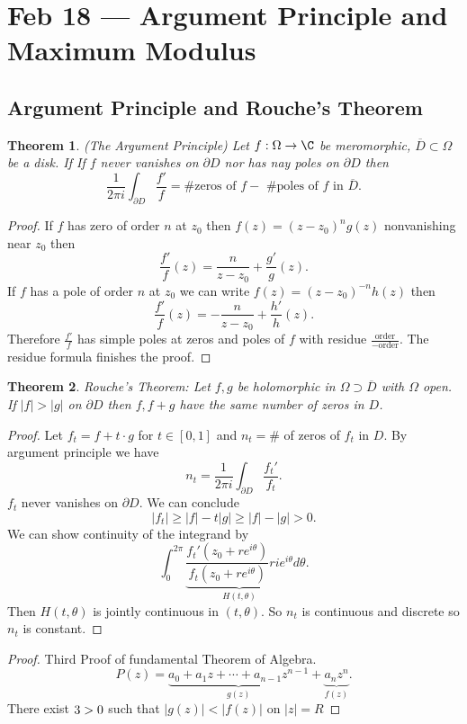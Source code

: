 \documentclass[a4paper]{article}
\newtheorem{thm}{Theorem}[section]
\begin{document}
\section{Feb 18 --- Argument Principle and Maximum Modulus}
\subsection{Argument Principle and Rouche's Theorem}
\begin{thm}
    (The Argument Principle) Let $f:\Omega\to \C$ be meromorphic, $\overline{D}\subset \Omega$ be a disk. If If $f$ never vanishes on $\partial D$ nor has nay poles on $\partial D$ then \[
    \frac{1}{2\pi i}\int_{\partial D}\frac{f'}{f}= \text{\# zeros of $f-$ \# poles of $f$ in $\overline{D}$}
    .\] 
\end{thm}
\begin{proof}
    If $f$ has zero of order $n$ at $z_0$ then $f(z)=(z-z_0)^ng(z)$ nonvanishing near $z_0$ then \[
    \frac{f'}{f}(z)=\frac{n}{z-z_0}+\frac{g'}{g}(z)
    .\] 
    If $f$ has a pole of order $n$ at $z_0$ we can write $f(z)=(z-z_0)^{-n}h(z)$ then \[
    \frac{f'}{f}(z)=-\frac{n}{z-z_0}+\frac{h'}{h}(z)
    .\]  
    Therefore $\frac{f'}{f}$ has simple poles at zeros and poles of $f$ with residue $ \frac{\text{order}}{-\text{order}}$. The residue formula finishes the proof. 
\end{proof}
\begin{thm}
    Rouche's Theorem: Let $f,g$ be holomorphic in $\Omega\supset \overline{D}$ with $\Omega$ open. If $|f|>|g|$ on $\partial D$ then $f,f+g$ have the same number of zeros in $D$. 
\end{thm}
\begin{proof}
    Let $f_t=f+t\cdot g$ for $t\in [0,1]$ and $n_t=\#$ of zeros of $f_t$ in $D$. 
    By argument principle we have \[
    n_t = \frac{1}{2\pi i}\int_{\partial D}\frac{f_t'}{f_t}
    .\] 
    $f_t$ never vanishes on $\partial D$. We can conclude \[
    |f_t|\geq |f|-t|g|\geq |f|-|g|>0
    .\] 
    We can show continuity of the integrand by \[
    \int_0^{2\pi}\underbrace{\frac{f_t'(z_0+re^{i\theta})}{f_t(z_0+re^{i\theta})}rie^{i\theta}}_{H(t,\theta)}d\theta
    .\] 
    Then $H(t,\theta)$ is jointly continuous in $(t,\theta)$. So $n_t$ is continuous and discrete so $n_t$ is constant. 
\end{proof}
\begin{proof}
    Third Proof of fundamental Theorem of Algebra. 
    \[
    P(z)=\underbrace{a_0+a_1z+\cdots+a_{n-1}z^{n-1}}_{g(z)}+\underbrace{a_nz^n}_{f(z)}
    .\] 
    There exist $3>0$ such that $|g(z)|<|f(z)|$ on $|z|=R$
\end{proof}
\end{document}
